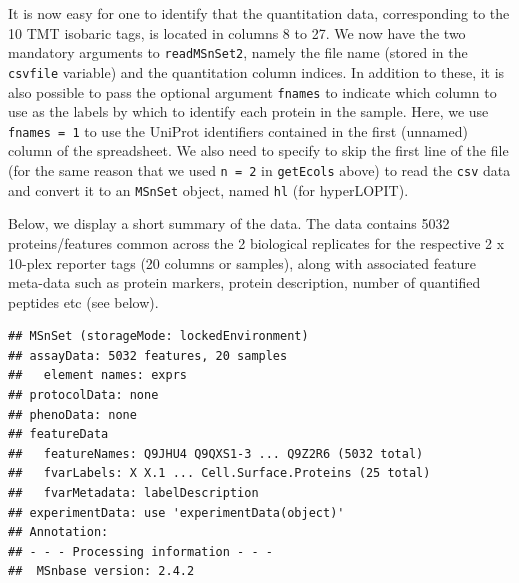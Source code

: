 It is now easy for one to identify that the quantitation data,
corresponding to the 10 TMT isobaric tags, is located in columns 8
to 27. We now have the two mandatory arguments to \texttt{readMSnSet2},
namely the file name (stored in the \texttt{csvfile} variable) and the
quantitation column indices. In addition to these, it is also possible
to pass the optional argument \texttt{fnames} to indicate which column to use
as the labels by which to identify each protein in the sample. Here,
we use \texttt{fnames = 1} to use the UniProt identifiers contained in the
first (unnamed) column of the spreadsheet. We also need to specify to
skip the first line of the file (for the same reason that we used
\texttt{n = 2} in \texttt{getEcols} above) to read the \texttt{csv} data and convert it to an
\texttt{MSnSet} object, named \texttt{hl} (for hyperLOPIT).

\begin{knitrout}
\color{fgcolor}\begin{kframe}
\begin{alltt}
 \hlkwb{<-}   \hlstd{=} \hlopt{:}\hlstd{,}  \hlstd{=} \hlstd{,}  \hlstd{=} \hlstd{)}
\end{alltt}
\end{kframe}
\end{knitrout}

Below, we display a short summary of the data. The data contains
5032 proteins/features common across the 2 biological replicates
for the respective 2 x 10-plex reporter tags (20
columns or samples), along with associated feature meta-data such as
protein markers, protein description, number of quantified peptides
etc (see below).


\begin{knitrout}
\color{fgcolor}\begin{kframe}
\begin{alltt}
\end{alltt}
\begin{verbatim}
## MSnSet (storageMode: lockedEnvironment)
## assayData: 5032 features, 20 samples 
##   element names: exprs 
## protocolData: none
## phenoData: none
## featureData
##   featureNames: Q9JHU4 Q9QXS1-3 ... Q9Z2R6 (5032 total)
##   fvarLabels: X X.1 ... Cell.Surface.Proteins (25 total)
##   fvarMetadata: labelDescription
## experimentData: use 'experimentData(object)'
## Annotation:  
## - - - Processing information - - -
##  MSnbase version: 2.4.2
\end{verbatim}
\end{kframe}
\end{knitrout}

